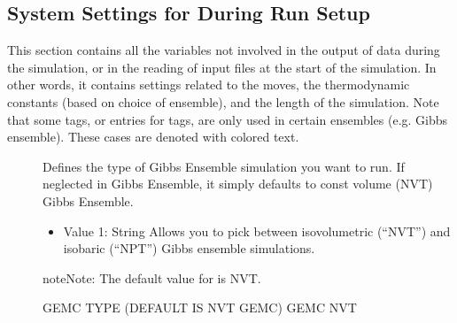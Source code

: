 \documentclass[letterpaper,10pt,english]{sphinxmanual}
\begin{document}
\subsection{System Settings for During Run Setup}
\label{\detokenize{input_file:system-settings-for-during-run-setup}}
\sphinxAtStartPar
This section contains all the variables not involved in the output of data during the simulation, or in the reading of input files at the start of the simulation. In other words, it contains settings related to the moves, the thermodynamic constants (based on choice of ensemble), and the length of the simulation.
Note that some tags, or entries for tags, are only used in certain ensembles (e.g. Gibbs ensemble). These cases are denoted with colored text.
\begin{description}
\item[{}] \leavevmode
\sphinxAtStartPar
{} Defines the type of Gibbs Ensemble simulation you want to run. If neglected in Gibbs Ensemble, it simply defaults to const volume (NVT) Gibbs Ensemble.
\begin{itemize}
\item {} 
\sphinxAtStartPar
Value 1: String \sphinxhyphen{} Allows you to pick between isovolumetric (“NVT”) and isobaric (“NPT”) Gibbs ensemble simulations.

\end{itemize}

\begin{sphinxadmonition}{note}{Note:}
\sphinxAtStartPar
The default value for  is NVT.
\end{sphinxadmonition}

\begin{sphinxVerbatim}[commandchars=\\\{\}]
\PYGZsh{}\PYGZsh{}\PYGZsh{}\PYGZsh{}\PYGZsh{}\PYGZsh{}\PYGZsh{}\PYGZsh{}\PYGZsh{}\PYGZsh{}\PYGZsh{}\PYGZsh{}\PYGZsh{}\PYGZsh{}\PYGZsh{}\PYGZsh{}\PYGZsh{}\PYGZsh{}\PYGZsh{}\PYGZsh{}\PYGZsh{}\PYGZsh{}\PYGZsh{}\PYGZsh{}\PYGZsh{}\PYGZsh{}\PYGZsh{}\PYGZsh{}\PYGZsh{}\PYGZsh{}\PYGZsh{}\PYGZsh{}\PYGZsh{}
\PYGZsh{} GEMC TYPE (DEFAULT IS NVT GEMC)
\PYGZsh{}\PYGZsh{}\PYGZsh{}\PYGZsh{}\PYGZsh{}\PYGZsh{}\PYGZsh{}\PYGZsh{}\PYGZsh{}\PYGZsh{}\PYGZsh{}\PYGZsh{}\PYGZsh{}\PYGZsh{}\PYGZsh{}\PYGZsh{}\PYGZsh{}\PYGZsh{}\PYGZsh{}\PYGZsh{}\PYGZsh{}\PYGZsh{}\PYGZsh{}\PYGZsh{}\PYGZsh{}\PYGZsh{}\PYGZsh{}\PYGZsh{}\PYGZsh{}\PYGZsh{}\PYGZsh{}\PYGZsh{}\PYGZsh{}
GEMC    NVT
\end{sphinxVerbatim}


\end{description}
\end{document}
